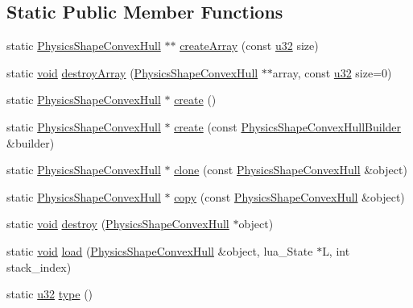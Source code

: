 \subsection*{Static Public Member Functions}
\begin{DoxyCompactItemize}
\item 
static \mbox{\hyperlink{classnjli_1_1_physics_shape_convex_hull}{Physics\+Shape\+Convex\+Hull}} $\ast$$\ast$ \mbox{\hyperlink{classnjli_1_1_physics_shape_convex_hull_a403439147d1030a6cbd6b8d273b19994}{create\+Array}} (const \mbox{\hyperlink{_util_8h_a10e94b422ef0c20dcdec20d31a1f5049}{u32}} size)
\item 
static \mbox{\hyperlink{_thread_8h_af1e856da2e658414cb2456cb6f7ebc66}{void}} \mbox{\hyperlink{classnjli_1_1_physics_shape_convex_hull_aba4f42fb932f88910c99d97252a446e0}{destroy\+Array}} (\mbox{\hyperlink{classnjli_1_1_physics_shape_convex_hull}{Physics\+Shape\+Convex\+Hull}} $\ast$$\ast$array, const \mbox{\hyperlink{_util_8h_a10e94b422ef0c20dcdec20d31a1f5049}{u32}} size=0)
\item 
static \mbox{\hyperlink{classnjli_1_1_physics_shape_convex_hull}{Physics\+Shape\+Convex\+Hull}} $\ast$ \mbox{\hyperlink{classnjli_1_1_physics_shape_convex_hull_a5f777094ab8a8507f0c077456272db93}{create}} ()
\item 
static \mbox{\hyperlink{classnjli_1_1_physics_shape_convex_hull}{Physics\+Shape\+Convex\+Hull}} $\ast$ \mbox{\hyperlink{classnjli_1_1_physics_shape_convex_hull_a022a78779d029e127635a9e8ec790ae2}{create}} (const \mbox{\hyperlink{classnjli_1_1_physics_shape_convex_hull_builder}{Physics\+Shape\+Convex\+Hull\+Builder}} \&builder)
\item 
static \mbox{\hyperlink{classnjli_1_1_physics_shape_convex_hull}{Physics\+Shape\+Convex\+Hull}} $\ast$ \mbox{\hyperlink{classnjli_1_1_physics_shape_convex_hull_a56c1bfac52ff878caaa4548b4dd7c20c}{clone}} (const \mbox{\hyperlink{classnjli_1_1_physics_shape_convex_hull}{Physics\+Shape\+Convex\+Hull}} \&object)
\item 
static \mbox{\hyperlink{classnjli_1_1_physics_shape_convex_hull}{Physics\+Shape\+Convex\+Hull}} $\ast$ \mbox{\hyperlink{classnjli_1_1_physics_shape_convex_hull_a8d7c4203a34f5db7faa52f594fe4bbf0}{copy}} (const \mbox{\hyperlink{classnjli_1_1_physics_shape_convex_hull}{Physics\+Shape\+Convex\+Hull}} \&object)
\item 
static \mbox{\hyperlink{_thread_8h_af1e856da2e658414cb2456cb6f7ebc66}{void}} \mbox{\hyperlink{classnjli_1_1_physics_shape_convex_hull_af78f40a84f2e0a1e4fe2fcf1c5f4ae74}{destroy}} (\mbox{\hyperlink{classnjli_1_1_physics_shape_convex_hull}{Physics\+Shape\+Convex\+Hull}} $\ast$object)
\item 
static \mbox{\hyperlink{_thread_8h_af1e856da2e658414cb2456cb6f7ebc66}{void}} \mbox{\hyperlink{classnjli_1_1_physics_shape_convex_hull_a88aff2dea2118c7a1c0f95c6d0d2ddda}{load}} (\mbox{\hyperlink{classnjli_1_1_physics_shape_convex_hull}{Physics\+Shape\+Convex\+Hull}} \&object, lua\+\_\+\+State $\ast$L, int stack\+\_\+index)
\item 
static \mbox{\hyperlink{_util_8h_a10e94b422ef0c20dcdec20d31a1f5049}{u32}} \mbox{\hyperlink{classnjli_1_1_physics_shape_convex_hull_a44c6ade4db7be6193253e6a364aa9713}{type}} ()
\end{DoxyCompactItemize}
